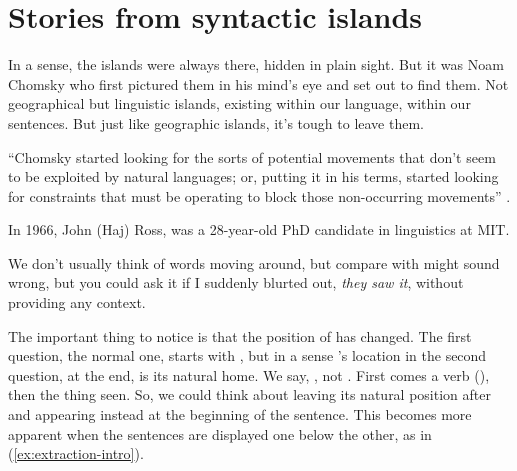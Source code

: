 \chapter{Stories from syntactic islands} \label{sec:extraction-islands}
In a sense, the islands were always there, hidden in plain sight. But it was Noam Chomsky who first pictured them in his mind's eye and set out to find them. Not geographical but linguistic islands, existing within our language, within our sentences. But just like geographic islands, it's tough to leave them.

``Chomsky started looking for the sorts of potential movements that don’t seem to be exploited by natural languages; or, putting it in his terms, started looking for constraints that must be operating to block those non-occurring movements'' \citep[92]{Harris2021}.

In 1966, John (Haj) Ross, was a 28-year-old PhD candidate in linguistics at MIT.


We don't usually think of words moving around, but compare  with   might sound wrong, but you could ask it if I suddenly blurted out, \textit{they saw it}, without providing any context.

The important thing to notice is that the position of  has changed. The first question, the normal one, starts with , but in a sense 's location in the second question, at the end, is its natural home. We say, , not . First comes a verb (), then the thing seen. So, we could think about  leaving its natural position after  and appearing instead at the beginning of the sentence. This becomes more apparent when the sentences are displayed one below the other, as in (\ref{ex:extraction-intro}).

\ea
\label{ex:extraction-intro}
\z\z

